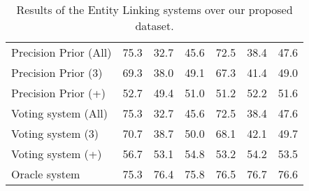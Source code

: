 \begin{table}[h!]
{\begin{tabular}{|l|rrr|rrr|}
    Precision Prior (All)                                  & 75.3                                 & 32.7                                    & 45.6                                   & 72.5                                 & 38.4                                    & 47.6                                   \\
    Precision Prior (3)                                    & 69.3                                 & 38.0                                    & 49.1                                   & 67.3                                 & 41.4                                    & 49.0                                   \\
    Precision Prior (+)                                    & 52.7                                 & 49.4                                    & 51.0                                   & 51.2                                 & 52.2                                    & 51.6                                   \\ \hline
    Voting system (All)                           & 75.3                        & 32.7                           & 45.6                          & 72.5                        & 38.4                           & 47.6                          \\
    Voting system (3)                                      & 70.7                                 & 38.7                                    & 50.0                                   & 68.1                                 & 42.1                                    & 49.7                                   \\
    Voting system (+)                             & 56.7                        & 53.1                           & 54.8                          & 53.2                        & 54.2                           & 53.5                          \\ \hline
    Oracle system                                          & 75.3                                 & 76.4                                    & 75.8                                   & 76.5                                 & 76.7                                    & 76.6                                   \\ \hline
    \end{tabular}%
    }
    \caption{Results of the Entity Linking systems over our proposed \WikiSPARQL{} dataset.}
    \label{table:elResultsWikiSparql}
\end{table}

